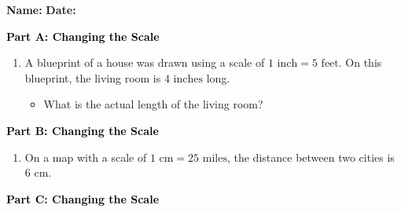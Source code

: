 \documentclass[12pt, letterpaper, fleqn]{article}
\newcommand{\blanklong}{\underline{\hspace{6.5cm}}}
\begin{document}
\textbf{Name:} \underline{\hspace{5cm}}
\hfill
\textbf{Date:} \underline{\hspace{3cm}}\\

\begin{tcolorbox}[colback=customteal!20]
\large\textcolor{black}{\textbf{Part A: Changing the Scale}}
\end{tcolorbox}

\vspace{3mm}

\begin{enumerate}[itemsep=4.2cm, leftmargin=0.6cm]
\item A blueprint of a house was drawn using a scale of $1\text{ inch} = 5\text{ feet}$. On this blueprint, the living room is $4\text{ inches}$ long.
\begin{itemize}
\item What is the actual length of the living room? \blanklong
\end{itemize}
\end{enumerate}

\newpage

\begin{tcolorbox}[colback=customteal!20]
\large\textcolor{black}{\textbf{Part B: Changing the Scale}}
\end{tcolorbox}

\vspace{3mm}

\begin{enumerate}[itemsep=4.2cm, leftmargin=0.6cm, resume]
\begin{itemize}
\item If you redraw the blueprint using a scale of $1\text{ inch} = 10\text{ feet}$, how long will the living room be on the \textit{new} blueprint? \blanklong
\end{itemize}
\item On a map with a scale of $1\text{ cm} = 25\text{ miles}$, the distance between two cities is $6\text{ cm}$.
\end{enumerate}

\newpage

\begin{tcolorbox}[colback=customteal!20]
\large\textcolor{black}{\textbf{Part C: Changing the Scale}}
\end{tcolorbox}
\end{document}
